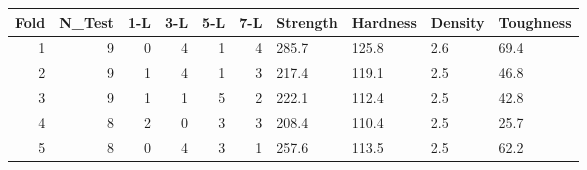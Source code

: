 \begin{tabular}{rrrrrrllll}
\toprule
Fold & N_Test & 1-L & 3-L & 5-L & 7-L & Strength & Hardness & Density & Toughness \\
\midrule
1 & 9 & 0 & 4 & 1 & 4 & 285.7 & 125.8 & 2.6 & 69.4 \\
2 & 9 & 1 & 4 & 1 & 3 & 217.4 & 119.1 & 2.5 & 46.8 \\
3 & 9 & 1 & 1 & 5 & 2 & 222.1 & 112.4 & 2.5 & 42.8 \\
4 & 8 & 2 & 0 & 3 & 3 & 208.4 & 110.4 & 2.5 & 25.7 \\
5 & 8 & 0 & 4 & 3 & 1 & 257.6 & 113.5 & 2.5 & 62.2 \\
\bottomrule
\end{tabular}
